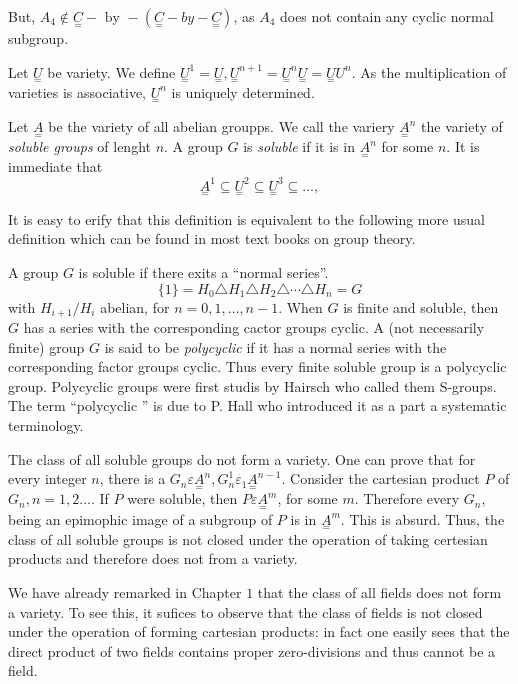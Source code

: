But, $A_4 \notin \underset{=}{C} - \text{ by } - (\underset{=}{C} -by
-\underset{=}{C})$, as $A_4$ does not contain any cyclic normal
subgroup. 

Let $\underset{=}{U}$ be variety. We define $\underset{=}{U}^1 =
\underset{=}{U}, \underset{=}{U}^{n+1} = \underset{=}{U}^n
\underset{=}{U} = \underset{=}{U} U^n$. As the multiplication of
varieties is associative, $\underset{=}{U}^n$ is uniquely determined. 

Let $\underset{=}{A}$ be the variety of all abelian groupps. We call
the variery $\underset{=}{A}^n$ the variety of \textit{soluble groups}
of lenght $n$. A group $G$ is \textit{soluble} if it is in
$\underset{=}{A}^n$ for some $n$. It is immediate that 
$$
\underset{=}{A}^1 \subseteq \underset{=}{U}^2 \subseteq
\underset{=}{U}^3 \subseteq \ldots, 
$$

It is easy to erify that this definition is equivalent to the
following more usual definition which can be found in most text books
on group theory. 

A group $G$ is soluble if there exits a ``normal series''. 
$$
\{1\} = H_0 \triangle H_1 \triangle H_2 \triangle \cdots \triangle H_n = G
$$
with $H_{i+1}/ H_i$ abelian, for $n=0, 1,\ldots, n-1$. When $G$ is
finite and soluble, then $G$ has a series with the corresponding
cactor groups cyclic. A (not necessarily finite) group $G$ is said to
be \textit{polycyclic} if it has a normal series with the
corresponding factor groups cyclic. Thus every finite soluble group is
a polycyclic group. Polycyclic groups were first studis by Hairsch who
called them S-groups. The term ``polycyclic '' is due to P. Hall who
introduced it as a part a systematic terminology.  

The class of all soluble groups do not form a variety. One can prove
that for every integer $n$, there is a $G_n \varepsilon
\underset{=}{A}^n, G_n ^1 \varepsilon_1
\underset{=}{A}^{n-1}$. Consider the cartesian product $P$ of $G_n,
n=1,2 \ldots$. If $P$ were soluble, then $P \varepsilon
\underset{=}{A}^m$, for some $m$. Therefore every $G_n$, being an
epimophic image of a subgroup of $P$ is in $\underset{=}{A}^m$. This
is absurd. Thus, the class of all soluble groups is not closed under
the operation of taking certesian products and therefore does not from
a variety. 

We have already remarked in Chapter $1$ that the class of all fields
does not form a variety. To see this, it sufices to observe that the
class of fields is not closed under the operation of forming cartesian
products: in fact one easily sees that the direct product of two
fields contains proper zero-divisions and thus cannot be a field.   

